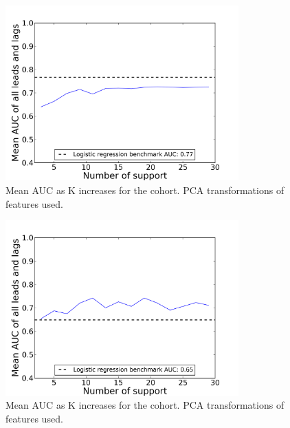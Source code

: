 \begin{figure}[ht!]
  \caption{Mean AUC as K increases for the \forum cohort. PCA transformations of features used.}\label{fig:hmm_logreg_support_over_time_forum_only_pca}
  \centering
    \includegraphics[width=0.8\textwidth]{figures/hmm_logreg/forum_only_pca_support_over_time.png}
\end{figure}

\begin{figure}[ht!]
  \caption{Mean AUC as K increases for the \both cohort. PCA transformations of features used.}\label{fig:hmm_logreg_support_over_time_forum_and_wiki_pca}
  \centering
    \includegraphics[width=0.8\textwidth]{figures/hmm_logreg/forum_and_wiki_pca_support_over_time.png}
\end{figure}

